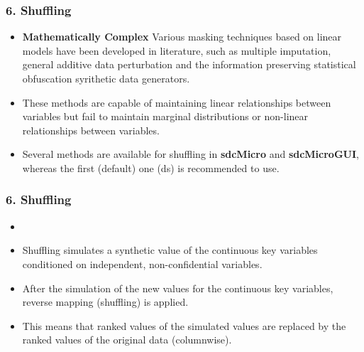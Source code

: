 \documentclass{beamer}
\begin{document}
\begin{frame}
	\frametitle{6. Shuffling}
	\begin{itemize}
		\item \textbf{Mathematically Complex}
		Various masking techniques based on linear models have been developed in literature, such as multiple imputation, general additive data perturbation and the information preserving statistical obfuscation syrithetic data generators.
		\item These methods are capable of maintaining
		linear relationships between variables but fail to maintain marginal distributions
		or non-linear relationships between variables.
		
		\item Several methods are available for shuffling in \textbf{sdcMicro} and \textbf{sdcMicroGUI}, whereas
		the first (default) one (ds) is recommended to use. 
		
	\end{itemize}
\end{frame}
\begin{frame}
	\frametitle{6. Shuffling}
	\begin{itemize}
		\item 
		\item Shuffling simulates a synthetic value of the continuous key variables conditioned on independent, non-conﬁdential variables. 
		\item After
		the simulation of the new values for the continuous key variables, reverse mapping
		(shuffling) is applied. 
		\item This means that ranked values of the simulated values are
		replaced by the ranked values of the original data (columnwise).
		
	\end{itemize}
\end{frame}
\end{document}
